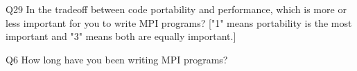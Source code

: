 \begin{description}%
\item{Q29} In the tradeoff between code portability and performance, which is more or less important for you to write MPI programs? ["1" means portability is the most important and "3" means both are equally important.]%
\item{Q6} How long have you been writing MPI programs?%
\end{description}%

